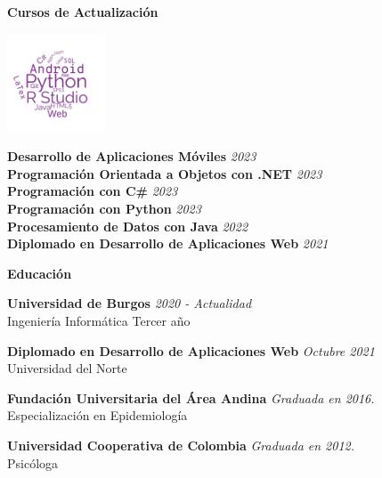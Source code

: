 \documentclass{resume} %
\begin{document}
\begin{rSection}{\textbf{\Large Cursos de Actualización}}
\begin{minipage}{0.3\textwidth}
    \includegraphics[width=110px]{wordcloud4.jpg}
\end{minipage}%
\begin{minipage}{0.7\textwidth}
    \textbf{Desarrollo de Aplicaciones Móviles} \emph{2023} \\
    \textbf{Programación Orientada a Objetos con .NET}  \emph{2023} \\
    \textbf{Programación con C\#} \emph{2023} \\
    \textbf{Programación con Python} \emph{2023} \\
    \textbf{Procesamiento de Datos con Java}  \emph{2022} \\
    \textbf{Diplomado en Desarrollo de Aplicaciones Web} \emph{2021}
\end{minipage}
\end{rSection}


\begin{rSection}{\textbf{\Large Educación}}

{\bf  Universidad de Burgos} \hfill {\em 2020 - Actualidad} 
\\ Ingeniería Informática \hfill { Tercer año}


{\bf Diplomado en Desarrollo de Aplicaciones Web} \hfill {\em Octubre 2021} 
\\ Universidad del Norte  \hfill { }

{\bf  Fundación Universitaria del Área Andina} \hfill {\em Graduada en 2016.} 
\\ Especialización en Epidemiología \hfill {}

{\bf   Universidad Cooperativa de Colombia} \hfill {\em Graduada en 2012.} 
\\ Psicóloga \hfill {}


\end{rSection}
\end{document}
